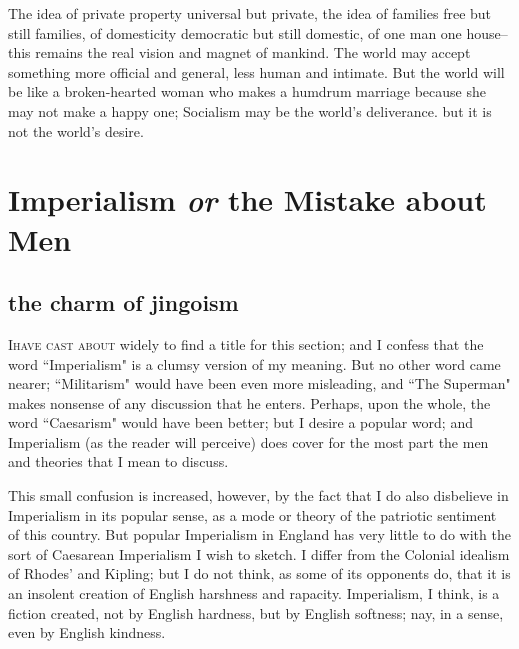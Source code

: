 \documentclass[final,10pt,letterpaper,twocolumn,openany]{book}
\newcommand{\dcap}[2]{
	 \lettrine[nindent=0em,findent=2pt,lines=3,loversize=.15,lraise=0]{#1}{#2}
 }
\begin{document}
The idea of private property universal but private, the idea of families
free but still families, of domesticity democratic but still domestic, of one
man one house--this remains the real vision and magnet of mankind. The
world may accept something more official and general, less human and
intimate. But the world will be like a broken-hearted woman who makes a
humdrum marriage because she may not make a happy one; Socialism
may be the world's deliverance. but it is not the world's desire.

\chapter{ Imperialism \textit{or} the Mistake about Men }
\section{the charm of jingoism}
    \dcap{I}{have cast about} widely to find a title for this section; and I confess
that the word ``Imperialism" is a clumsy version of my meaning. But no
other word came nearer; ``Militarism" would have been even more
misleading, and ``The Superman" makes nonsense of any discussion that
he enters. Perhaps, upon the whole, the word ``Caesarism" would have
been better; but I desire a popular word; and Imperialism (as the reader
will perceive) does cover for the most part the men and theories that I
mean to discuss.

This small confusion is increased, however, by the fact that I do also
disbelieve in Imperialism in its popular sense, as a mode or theory of the
patriotic sentiment of this country. But popular Imperialism in England
has very little to do with the sort of Caesarean Imperialism I wish to
sketch. I differ from the Colonial idealism of Rhodes' and Kipling; but I do
not think, as some of its opponents do, that it is an insolent creation of
English harshness and rapacity. Imperialism, I think, is a fiction created,
not by English hardness, but by English softness; nay, in a sense, even by
English kindness.
\end{document}
